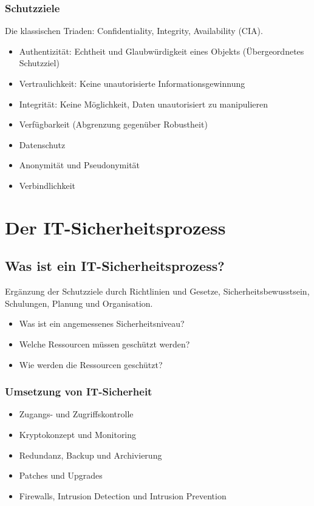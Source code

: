 \subsubsection{Schutzziele}

Die klassischen Triaden: Confidentiality, Integrity, Availability (CIA).

\begin{itemize}
	\item Authentizität: Echtheit und Glaubwürdigkeit eines Objekts (Übergeordnetes Schutzziel)
	\item Vertraulichkeit: Keine unautorisierte Informationsgewinnung
	\item Integrität: Keine Möglichkeit, Daten unautorisiert zu manipulieren
	\item Verfügbarkeit (Abgrenzung gegenüber Robustheit)
	\item Datenschutz
	\item Anonymität und Pseudonymität
	\item Verbindlichkeit
\end{itemize}



\section{Der IT-Sicherheitsprozess}

\subsection{Was ist ein IT-Sicherheitsprozess?}

Ergänzung der Schutzziele durch Richtlinien und Gesetze, Sicherheitsbewusstsein, Schulungen, Planung und Organisation.

\begin{itemize}
	\item Was ist ein angemessenes Sicherheitsniveau?
	\item Welche Ressourcen müssen geschützt werden?
	\item Wie werden die Ressourcen geschützt?
\end{itemize}

\subsubsection{Umsetzung von IT-Sicherheit}
\begin{itemize}
	\item Zugangs- und Zugriffskontrolle
	\item Kryptokonzept und Monitoring
	\item Redundanz, Backup und Archivierung
	\item Patches und Upgrades
	\item Firewalls, Intrusion Detection und Intrusion Prevention
\end{itemize}

